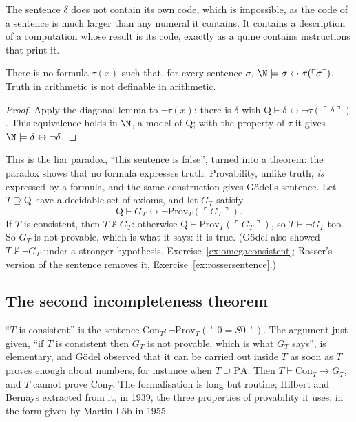 The sentence $\delta$ does not contain its own code, which is impossible, as the code of a sentence is much larger than any numeral it contains. It contains a description of a computation whose result is its code, exactly as a quine contains instructions that print it.

\begin{theorem}[Tarski, 1933]\label{thm:tarski}
There is no formula $\tau(x)$ such that, for every sentence $\sigma$, $\N\models\sigma\leftrightarrow\tau(\ulcorner\sigma\urcorner)$. Truth in arithmetic is not definable in arithmetic.
\end{theorem}

\begin{proof}
Apply the diagonal lemma to $\neg\tau(x)$: there is $\delta$ with $\mathrm Q\vdash\delta\leftrightarrow\neg\tau(\ulcorner\delta\urcorner)$. This equivalence holds in $\N$, a model of $\mathrm Q$; with the property of $\tau$ it gives $\N\models\delta\leftrightarrow\neg\delta$.
\end{proof}

This is the liar paradox, ``this sentence is false'', turned into a theorem: the paradox shows that no formula expresses truth. Provability, unlike truth, \emph{is} expressed by a formula, and the same construction gives Gödel's sentence. Let $T\supseteq\mathrm Q$ have a decidable set of axioms, and let $G_T$ satisfy
\[
\mathrm Q\vdash G_T\leftrightarrow\neg\mathrm{Prov}_T(\ulcorner G_T\urcorner).
\]
If $T$ is consistent, then $T\nvdash G_T$: otherwise $\mathrm Q\vdash\mathrm{Prov}_T(\ulcorner G_T\urcorner)$, so $T\vdash\neg G_T$ too. So $G_T$ is not provable, which is what it says: it is true. (Gödel also showed $T\nvdash\neg G_T$ under a stronger hypothesis, Exercise~\ref{ex:omegaconsistent}; Rosser's version of the sentence removes it, Exercise~\ref{ex:rossersentence}.)

\subsection*{The second incompleteness theorem}

``$T$ is consistent'' is the sentence $\mathrm{Con}_T:\neg\mathrm{Prov}_T(\ulcorner0=S0\urcorner)$. The argument just given, ``if $T$ is consistent then $G_T$ is not provable, which is what $G_T$ says'', is elementary, and Gödel observed that it can be carried out inside $T$ as soon as $T$ proves enough about numbers, for instance when $T\supseteq\mathrm{PA}$. Then $T\vdash\mathrm{Con}_T\to G_T$, and $T$ cannot prove $\mathrm{Con}_T$. The formalisation is long but routine; Hilbert and Bernays extracted from it, in 1939, the three properties of provability it uses, in the form given by Martin Löb in 1955.

